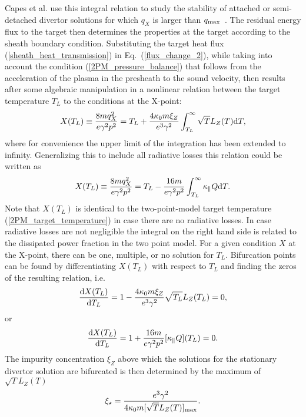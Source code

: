 \documentclass[amsmath,amssymb,a4]{revtex4}
\begin{document}
{Capes et al. use this integral relation to study the stability of attached or semi-detached divertor solutions for which $q_X$ is larger than $q_{\rm max}$~\cite{capes1992}. The residual energy flux to the target then determines the properties at the target according to the sheath boundary condition. Substituting the target heat flux (\ref{sheath_heat_transmission}) in Eq.~(\ref{flux_change_2}), while taking into account the condition (\ref{2PM_pressure_balance}) that follows from the acceleration of the plasma in the presheath to the sound velocity, then results after some algebraic manipulation in a nonlinear relation between the target temperature $T_L$ to the conditions at the X-point:
\begin{equation}
    X(T_L) \equiv {8 m q_X^2 \over e \gamma^2 p^2} = T_L + {4 \kappa_0 m \xi_Z \over e^3 \gamma^2} \int_{T_L}^\infty \sqrt{T} L_Z(T) {\rm d}T,
\end{equation}
where for convenience the upper limit of the integration has been extended to infinity. Generalizing this to include all radiative losses this relation could be written as
\begin{equation}
    X(T_L) \equiv {8 m q_X^2 \over e \gamma^2 p^2} = T_L - {16 m \over e \gamma^2 p^2}  \int_{T_L}^\infty \kappa_\parallel Q {\rm d}T.
\end{equation}
Note that $X(T_L)$ is identical to the two-point-model target temperature (\ref{2PM_target_temperature}) in case there are no radiative losses. In case radiative losses are not negligible the integral on the right hand side is related to the dissipated power fraction in the two point model. For a given condition $X$ at the X-point, there can be one, multiple, or no solution for $T_L$. Bifurcation points can be found by differentiating $X(T_L)$ with respect to $T_L$ and finding the zeros of the resulting relation, i.e.
\begin{equation}
    {{\rm d} X(T_L) \over {\rm d}T_L} = 1 - {4 \kappa_0 m \xi_Z \over e^3 \gamma^2} \sqrt{T_L} L_Z(T_L) = 0,
\end{equation}
or
\begin{equation}
    {{\rm d} X(T_L) \over {\rm d}T_L} = 1 + {16 m \over e \gamma^2 p^2} [\kappa_\parallel Q](T_L) = 0.
\end{equation}
The impurity concentration $\xi_Z$ above which the solutions for the stationary divertor solution are bifurcated is then determined by the maximum of $\sqrt{T} L_Z(T)$
\begin{equation}
    \xi_\star = {e^3 \gamma^2 \over 4 \kappa_0 m [\sqrt{T} L_Z(T)]_{\rm max}}.

\end{equation}}
\end{document}
